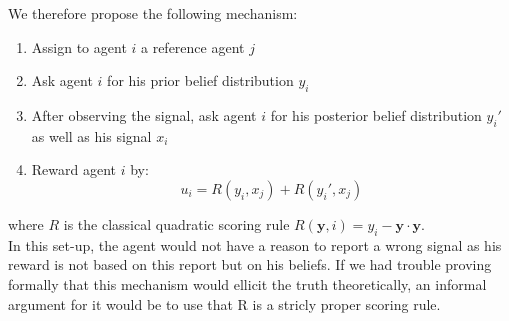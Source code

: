 \documentclass{scrartcl}
\begin{document}
We therefore propose the following mechanism:
\begin{enumerate}
\item Assign to agent $i$ a reference agent $j$
\item Ask agent $i$ for his prior belief distribution $y_i$
\item After observing the signal, ask agent $i$ for his posterior belief distribution $y_i'$ as well as his signal $x_i$
\item Reward agent $i$ by:
$$u_i = R(y_i,x_j) + R(y_i',x_j)$$
\end{enumerate}
where $R$ is the classical quadratic scoring rule $R(\mathbf{y},i) = y_i -  \mathbf{y}\cdot\mathbf{y}$.\\

In this set-up, the agent would not have a reason to report a wrong signal as his reward is not based on this report but on his beliefs. If we had trouble proving formally that this mechanism would ellicit the truth theoretically, an informal argument for it would be to use that R is a stricly proper scoring rule.\\
\end{document}
